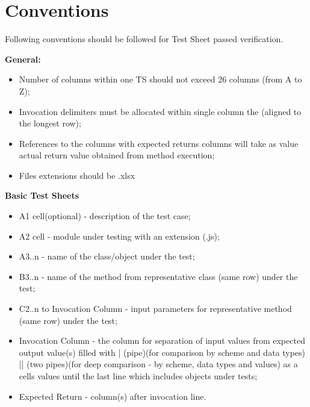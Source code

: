 \section{Conventions}
\label{sec:conventions}

Following conventions should be followed for Test Sheet passed verification.

\textbf{General:}
\begin{itemize}
\item Number of columns within one TS should not exceed 26 columns (from A to Z);
\item Invocation delimiters must be allocated within single column the (aligned to the longest row);
\item References to the columns with expected returns columns will take as value actual return value obtained from method execution;
\item Files extensions should be .xlsx\\
\end{itemize}

\textbf{ Basic Test Sheets} 
\begin{itemize}
\item A1 cell(optional) - description of the test case;
\item A2 cell - module under testing with an extension (.js);
\item A3..n - name of the class/object under the test;
\item B3..n - name of the method from representative class (same row) under the test;
\item C2..n to Invocation Column - input parameters for representative method (same row) under the test;
\item Invocation Column - the column for separation of input values from expected output value(s) filled with | (pipe)(for comparison by scheme and data types) || (two pipes)(for deep comparison - by scheme, data types and values) as a cells values until the last line which includes objects under tests;
\item Expected Return - column(s) after invocation line.\\
\end{itemize}

